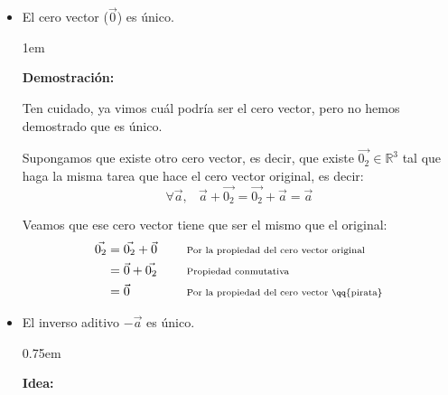 \documentclass[12pt, fleqn]{report}                             %
\newenvironment{SmallIndentation}[1][0.75em]                    %
        {\begin{adjustwidth}{#1}{}\begin{footnotesize}}             %
        {\end{footnotesize}\end{adjustwidth}}                       %
\newcommand \Quote              {\qq}                           %
\DeclareMathOperator \Space     {\quad}                         %
\DeclareMathOperator \MiniSpace {\;}                            %
\newcommand \Remember[1]    {\Space\text{\scriptsize{#1}}}      %
\theoremstyle{break}                                            %
\begin{document}
                \begin{itemize}

                    \item El cero vector ($\vec{0}$) es único.
                    
                        \begin{SmallIndentation}[1em]
                            \textbf{Demostración:} 

                            Ten cuidado, ya vimos cuál podría ser el cero vector, pero no hemos demostrado
                            que es único.

                            Supongamos que existe otro cero vector, es decir, que existe $\vec{0_2} \in \mathbb{R}^3$
                            tal que haga la misma tarea que hace el cero vector original, es decir:
                            \begin{equation*}
                                \forall \vec{a}, \MiniSpace 
                                    \vec{a} + \vec{0_2} = \vec{0_2} + \vec{a} = \vec{a} 
                            \end{equation*}

                            Veamos que ese cero vector \Quote{pirata} tiene que ser el mismo que el original:
                            \begin{align*}
                                \vec{0_2} 
                                    &= \vec{0_2} + \vec{0}      &&\Remember{Por la propiedad del cero vector original}          \\
                                    &= \vec{0}   + \vec{0_2}    &&\Remember{Propiedad conmutativa}                              \\
                                    &= \vec{0}                  &&\Remember{Por la propiedad del cero vector \Quote{pirata}}
                            \end{align*}

                        \end{SmallIndentation}
                    
                    \item El inverso aditivo $-\vec{a}$ es único.
                
                        \begin{SmallIndentation}
                            \textbf{Idea:}


\end{SmallIndentation}
\end{itemize}
\end{document}

